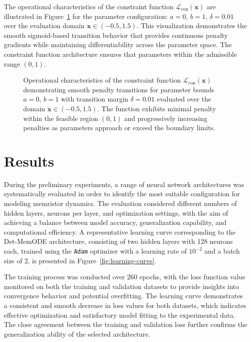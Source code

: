 \documentclass[11pt, oneside]{article}
\begin{document}
The operational characteristics of the constraint function \(\mathcal{L}_{\mathrm{con}}(\mathbf{x})\) are illustrated in Figure~\ref{fig:constrains} for the parameter configuration: \(a=0\), \(b=1\), \(\delta=0.01\) over the evaluation domain \(\mathbf{x} \in (-0.5, 1.5)\). This visualization demonstrates the smooth sigmoid-based transition behavior that provides continuous penalty gradients while maintaining differentiability across the parameter space. The constraint function architecture ensures that parameters within the admissible range \((0,1)\).

\begin{figure}[H]
    \centering
    \resizebox{0.5\linewidth}{!}{%
        
    }
    \caption{Operational characteristics of the constraint function \(\mathcal{L}_{\mathrm{con}}(\mathbf{x})\) demonstrating smooth penalty transitions for parameter bounds \(a=0\), \(b=1\) with transition margin \(\delta=0.01\) evaluated over the domain \(\mathbf{x} \in (-0.5, 1.5)\). The function exhibits minimal penalty within the feasible region \((0,1)\) and progressively increasing penalties as parameters approach or exceed the boundary limits.}
    \label{fig:constrains}
\end{figure}





\section{Results}

During the preliminary experiments, a range of neural network architectures was systematically evaluated in order to identify the most suitable configuration for modeling memristor dynamics. The evaluation considered different numbers of hidden layers, neurons per layer, and optimization settings, with the aim of achieving a balance between model accuracy, generalization capability, and computational efficiency. A representative learning curve corresponding to the Det-MemODE architecture, consisting of two hidden layers with 128 neurons each, trained using the \verb|Adam| optimizer with a learning rate of \(10^{-2}\) and a batch size of 2, is presented in Figure~\ref{fig:learning-curve}.

The training process was conducted over 260 epochs, with the loss function value monitored on both the training and validation datasets to provide insights into convergence behavior and potential overfitting. The learning curve demonstrates a consistent and smooth decrease in loss values for both datasets, which indicates effective optimization and satisfactory model fitting to the experimental data. The close agreement between the training and validation loss further confirms the generalization ability of the selected architecture.
\end{document}
